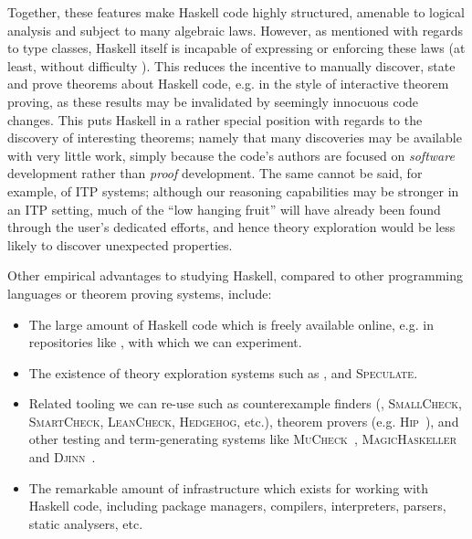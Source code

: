 Together, these features make Haskell code highly structured, amenable to
logical analysis and subject to many algebraic laws. However, as mentioned with
regards to type classes, Haskell itself is incapable of expressing or enforcing
these laws (at least, without difficulty \cite{lindley2014hasochism}). This
reduces the incentive to manually discover, state and prove theorems about
Haskell code, e.g. in the style of interactive theorem proving, as these results
may be invalidated by seemingly innocuous code changes. This puts Haskell in a
rather special position with regards to the discovery of interesting theorems;
namely that many discoveries may be available with very little work, simply
because the code's authors are focused on \emph{software} development rather
than \emph{proof} development. The same cannot be said, for example, of ITP
systems; although our reasoning capabilities may be stronger in an ITP setting,
much of the ``low hanging fruit'' will have already been found through the
user's dedicated efforts, and hence theory exploration would be less likely to
discover unexpected properties.

Other empirical advantages to studying Haskell, compared to other programming
languages or theorem proving systems, include:

\begin{itemize}
\item The large amount of Haskell code which is freely available online, e.g. in
  repositories like \hackage{}, with which we
  can experiment.

\item The existence of theory exploration systems such as \hspec{}, \qspec{} and
  \textsc{Speculate}.

\item Related tooling we can re-use such as counterexample finders (\qcheck{},
  \textsc{SmallCheck}, \textsc{SmartCheck}, \textsc{LeanCheck},
  \textsc{Hedgehog}, etc.), theorem provers
  (e.g. \textsc{Hip}~\cite{rosen2012proving}), and other testing and
  term-generating systems like \textsc{MuCheck}~\cite{le2014mucheck},
  \textsc{MagicHaskeller}~\cite{katayama2011magichaskeller} and
  \textsc{Djinn}~\cite{augustsson2005djinn}.

\item The remarkable amount of infrastructure which exists for working with
  Haskell code, including package managers, compilers, interpreters, parsers,
  static analysers, etc.
\end{itemize}

